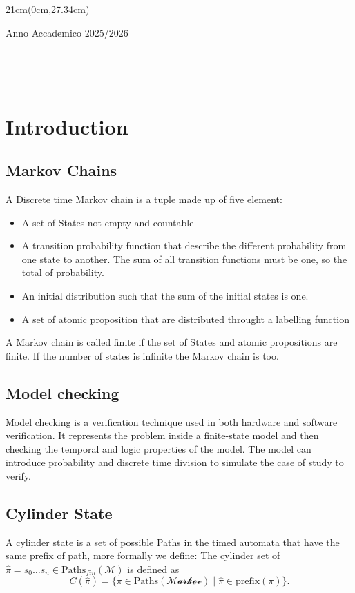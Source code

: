 \documentclass[a4paper,10 pt,titlepage,twoside]{book}
\numberwithin{equation}{chapter}
\theoremstyle{plain}
\theoremstyle{definition}
\DeclareMathOperator{\1}{\mathbb{1}}
\begin{document}
	\begin{textblock*}{21cm}(0cm,27.34cm)
		\centerline{Anno Accademico 2025/2026}
	\end{textblock*}
	
	\endgroup
	
	
	\newpage
	$ $
	
	\pagestyle{plain}
	\frontmatter
	
	
	\tableofcontents
	
	
	
	\newpage
	$ $
	
	\chapter*{Introduction}
	\section*{Markov Chains}
	A Discrete time Markov chain is a tuple made up of five element: 
	\begin{itemize}
		\item A set of States not empty and countable 
		\item A transition probability function that describe the different probability from one state to another. The sum of all transition functions must be one, so the total of probability. 
		\item An initial distribution such that the sum of the initial states is one.
		\item A set of atomic proposition that are distributed throught a labelling function 
	\end{itemize}
	A Markov chain is called finite if the set of States and atomic propositions are finite. If the number of states is infinite the Markov chain is too. 
	
	\section*{Model checking}
	Model checking is a verification technique used in both hardware and software verification. It represents the problem inside a finite-state model and then checking the temporal and logic properties of the model. The model can introduce probability and discrete time division to simulate the case of study to verify. 
	\section*{Cylinder State}
	A cylinder state is a set of possible Paths in the timed automata that have the same prefix of path, more formally we define: 
	The cylinder set of $\widehat{\pi} = s_0 \dots s_n \in \text{Paths}_{fin}(\mathcal{M})$ is defined as
	\[
	C(\widehat{\pi}) = \{ \pi \in \text{Paths}(\mathcal{Markov}) \mid \widehat{\pi} \in \text{prefix}(\pi) \}.
	\] 
\end{document}
